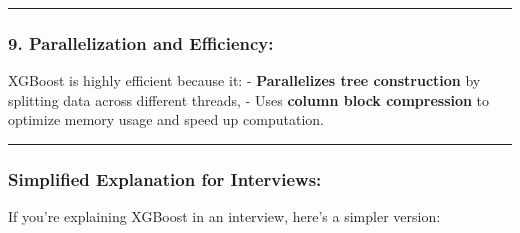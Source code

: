 \documentclass[12pt]{book}
\begin{document}
\begin{center}\rule{0.5\linewidth}{0.5pt}\end{center}

\subsubsection{\texorpdfstring{9. \textbf{Parallelization and
Efficiency:}}{9. Parallelization and Efficiency:}}\label{parallelization-and-efficiency}

XGBoost is highly efficient because it: - \textbf{Parallelizes tree
construction} by splitting data across different threads, - Uses
\textbf{column block compression} to optimize memory usage and speed up
computation.

\begin{center}\rule{0.5\linewidth}{0.5pt}\end{center}

\subsubsection{Simplified Explanation for
Interviews:}\label{simplified-explanation-for-interviews-2}

If you're explaining XGBoost in an interview, here's a simpler version:
\end{document}
